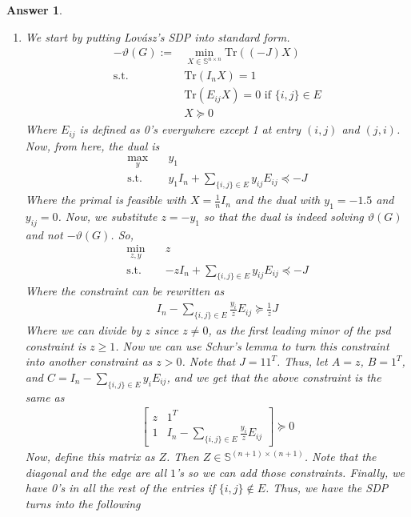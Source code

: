 \documentclass[12pt]{article}
\theoremstyle{colon}
\newtheorem*{answer}{Answer}
\begin{document}
\begin{answer}
  \leavevmode
  \begin{enumerate}[label=\arabic*)]
    \item We start by putting Lov{\'a}sz's SDP into standard form.
      \begin{align*}
        -\vartheta(G) := &\min_{X \in \mathbb{S}^{n \times n}} \text{Tr}((-J)X) \\
        \text{s.t. } &\text{Tr}(I_n X) = 1 \\
        &\text{Tr}(E_{ij} X) = 0 \text{ if } \{i,j\} \in E \\
        &X \succeq 0
      \end{align*}
      Where $E_{ij}$ is defined as 0's everywhere except 1 at entry $(i,j)$ and $(j,i)$. Now, from here, the dual is
      \begin{align*}
        \max_{y} \quad &y_1 \\
        \text{s.t. } &y_1 I_n + \sum_{\{i,j\} \in E} y_{ij} E_{ij} \preceq -J
      \end{align*}
      Where the primal is feasible with $X = \frac{1}{n} I_n$ and the dual with $y_1 = -1.5$ and $y_{ij} = 0$. Now, we substitute $z = -y_1$ so that the dual is indeed solving $\vartheta(G)$ and not $-\vartheta(G)$. So,
      \begin{align*}
        \min_{z, y} \quad &z \\
        \text{s.t. } &-z I_n + \sum_{\{i,j\} \in E} y_{ij} E_{ij} \preceq -J
      \end{align*}
      Where the constraint can be rewritten as
      \begin{gather*}
        I_n - \sum_{\{i,j\} \in E} \frac{y_i}{z} E_{ij} \succeq \frac{1}{z}  J
      \end{gather*}
      Where we can divide by $z$ since $z \neq 0$, as the first leading minor of the psd constraint is $z \geq 1$. Now we can use Schur's lemma to turn this constraint into another constraint as $z > 0$. Note that $J = 1 1^T$. Thus, let $A = z$, $B = 1^T$, and $C = I_n - \sum_{\{i,j\} \in E} y_i E_{ij}$, and we get that the above constraint is the same as
      \begin{gather*}
        \begin{bmatrix}
          z & 1^T \\
          1 & I_n - \sum_{\{i,j\} \in E} \frac{y_i}{z} E_{ij}
        \end{bmatrix} \succeq 0
      \end{gather*}
      Now, define this matrix as $Z$. Then $Z \in \mathbb{S}^{(n+1) \times (n+1)}$. Note that the diagonal and the edge are all $1$'s so we can add those constraints. Finally, we have 0's in all the rest of the entries if $\{i,j\} \notin E$. Thus, we have the SDP turns into the following

\end{enumerate}
\end{answer}
\end{document}
